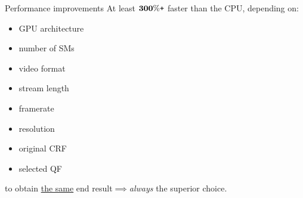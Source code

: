 \documentclass[aspectratio=1610]{beamer}
\begin{document}
\begin{frame}{\textcolor{NvidiaGreen}{Performance improvements}}
    At least \textcolor{NvidiaGreen}{\Huge{$\bm{300\%\text{\texttt{+}}}$}} faster than the CPU, depending on:
    \begin{itemize}
        \item[\textcolor{NvidiaGreen}{\textbullet}] GPU architecture
        \item[\textcolor{NvidiaGreen}{\textbullet}] number of SMs
        \item[\textcolor{NvidiaGreen}{\textbullet}] video format
        \item[\textcolor{NvidiaGreen}{\textbullet}] stream length
        \item[\textcolor{NvidiaGreen}{\textbullet}] framerate
        \item[\textcolor{NvidiaGreen}{\textbullet}] resolution
        \item[\textcolor{NvidiaGreen}{\textbullet}] original CRF
        \item[\textcolor{NvidiaGreen}{\textbullet}] selected QF
    \end{itemize}
    to obtain \underline{the same} end result$\implies$\textit{always} the superior choice.
\end{frame}
\end{document}
